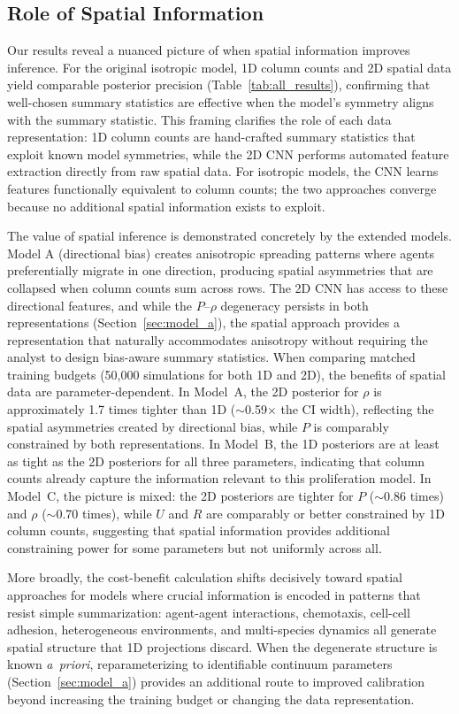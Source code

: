\documentclass{article}
\begin{document}
\subsection{Role of Spatial Information}
Our results reveal a nuanced picture of when spatial information improves inference. For the original isotropic model, 1D column counts and 2D spatial data yield comparable posterior precision (Table~\ref{tab:all_results}), confirming that well-chosen summary statistics are effective when the model's symmetry aligns with the summary statistic. This framing clarifies the role of each data representation: 1D column counts are hand-crafted summary statistics that exploit known model symmetries, while the 2D CNN performs automated feature extraction directly from raw spatial data. For isotropic models, the CNN learns features functionally equivalent to column counts; the two approaches converge because no additional spatial information exists to exploit.

The value of spatial inference is demonstrated concretely by the extended models. Model A (directional bias) creates anisotropic spreading patterns where agents preferentially migrate in one direction, producing spatial asymmetries that are collapsed when column counts sum across rows. The 2D CNN has access to these directional features, and while the $P$--$\rho$ degeneracy persists in both representations (Section~\ref{sec:model_a}), the spatial approach provides a representation that naturally accommodates anisotropy without requiring the analyst to design bias-aware summary statistics. When comparing matched training budgets (50{,}000 simulations for both 1D and 2D), the benefits of spatial data are parameter-dependent. In Model~A, the 2D posterior for $\rho$ is approximately 1.7 times tighter than 1D ($\sim$0.59$\times$ the CI width), reflecting the spatial asymmetries created by directional bias, while $P$ is comparably constrained by both representations. In Model~B, the 1D posteriors are at least as tight as the 2D posteriors for all three parameters, indicating that column counts already capture the information relevant to this proliferation model. In Model~C, the picture is mixed: the 2D posteriors are tighter for $P$ ($\sim$0.86 times) and $\rho$ ($\sim$0.70 times), while $U$ and $R$ are comparably or better constrained by 1D column counts, suggesting that spatial information provides additional constraining power for some parameters but not uniformly across all.

More broadly, the cost-benefit calculation shifts decisively toward spatial approaches for models where crucial information is encoded in patterns that resist simple summarization: agent-agent interactions, chemotaxis, cell-cell adhesion, heterogeneous environments, and multi-species dynamics all generate spatial structure that 1D projections discard. When the degenerate structure is known \emph{a~priori}, reparameterizing to identifiable continuum parameters (Section~\ref{sec:model_a}) provides an additional route to improved calibration beyond increasing the training budget or changing the data representation.
\end{document}

